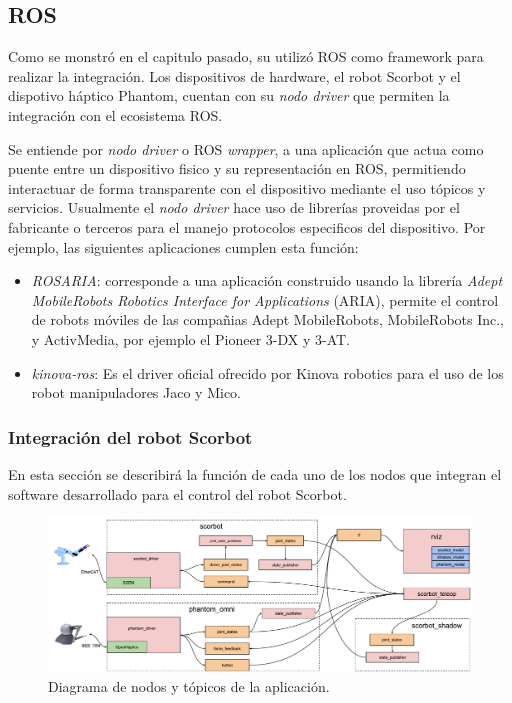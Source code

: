 \subsection{ROS}

Como se monstró en el capitulo pasado, su utilizó ROS como framework para realizar la integración. Los dispositivos de hardware, el robot Scorbot y el dispotivo háptico Phantom, cuentan con su \textit{nodo driver} que permiten la integración con el ecosistema ROS.

Se entiende por \textit{nodo driver} o ROS \textit{wrapper}, a una aplicación que actua como puente entre un dispositivo fisico y su representación en ROS, permitiendo interactuar de forma transparente con el dispositivo mediante el uso tópicos y servicios. Usualmente el \textit{nodo driver} hace uso de librerías proveidas por el fabricante o terceros para el manejo protocolos especificos del dispositivo. Por ejemplo, las siguientes aplicaciones cumplen esta función:

\begin{itemize}

\item \textit{ROSARIA}\cite{rosaria}: corresponde a una aplicación construido usando la librería \textit{Adept MobileRobots Robotics Interface for Applications} (ARIA), permite el control de robots móviles de las compañias Adept MobileRobots, MobileRobots Inc., y ActivMedia, por ejemplo el Pioneer 3-DX y 3-AT.

\item \textit{kinova-ros}\cite{kinova}: Es el driver oficial ofrecido por Kinova robotics para el uso de los robot manipuladores Jaco y Mico.

\end{itemize}

\subsubsection{Integración del robot Scorbot}

En esta sección se describirá la función de cada uno de los nodos que integran el software desarrollado para el control del robot Scorbot.

\begin{figure}[ht]
  \centering
  \includegraphics[width=\textwidth]{img/cap4/scorbot_software.pdf}
  \caption{Diagrama de nodos y tópicos de la aplicación.}
  \label{cap4_scorbot_software}
\end{figure}

